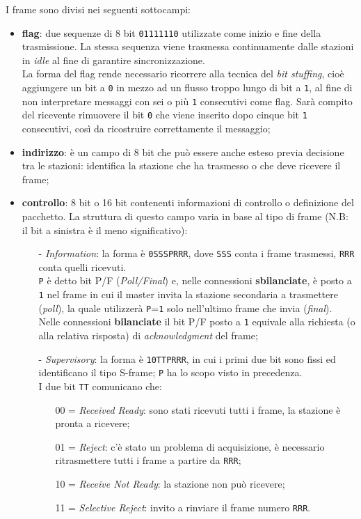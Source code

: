 \documentclass[a4paper,11pt]{article}
\def\code#1{\texttt{#1}}
\def\italic#1{\textit{#1}}
\begin{document}
I frame sono divisi nei seguenti sottocampi:
\begin{itemize}
	\item \textbf{flag}: due sequenze di 8 bit \code{01111110} utilizzate come inizio e fine della trasmissione. La stessa sequenza viene trasmessa continuamente dalle stazioni in \italic{idle} al fine di garantire sincronizzazione.
	\\La forma del flag rende necessario ricorrere alla tecnica del \italic{bit stuffing}, cioè aggiungere un bit a \code{0} in mezzo ad un flusso troppo lungo di bit a \code{1}, al fine di non interpretare messaggi con sei o più \code{1} consecutivi come flag.
	Sarà compito del ricevente rimuovere il bit \code{0} che viene inserito dopo cinque bit \code{1} consecutivi, così da ricostruire correttamente il messaggio;
	\item \textbf{indirizzo}: è un campo di 8 bit che può essere anche esteso previa decisione tra le stazioni: identifica la stazione che ha trasmesso o che deve ricevere il frame;
	\item \textbf{controllo}: 8 bit o 16 bit contenenti informazioni di controllo o definizione del pacchetto. La struttura di questo campo varia in base al tipo di frame (N.B: il bit a sinistra è il meno significativo):
	\begin{itemize}
		\item[-]\italic{Information}: la forma è \code{0SSSPRRR}, dove \code{SSS} conta i frame trasmessi, \code{RRR} conta quelli ricevuti.
		\\\code{P} è detto bit P/F (\italic{Poll/Final}) e, nelle connessioni \textbf{sbilanciate}, è posto a \code{1} nel frame in cui il master invita la stazione secondaria a trasmettere (\italic{poll}), la quale utilizzerà \code{P}=\code{1} solo nell'ultimo frame che invia (\italic{final}).
		Nelle connessioni \textbf{bilanciate} il bit P/F posto a \code{1} equivale alla richiesta (o alla relativa risposta) di \textit{acknowledgment} del frame;
		
		\item[-]\italic{Supervisory}: la forma è \code{10TTPRRR}, in cui i primi due bit sono fissi ed identificano il tipo S-frame; \code{P} ha lo scopo visto in precedenza.
		\\I due bit \code{TT} comunicano che:
		\begin{itemize}
			\item[00]= \italic{Received Ready}: sono stati ricevuti tutti i frame, la stazione è pronta a ricevere;
			\item[01]= \italic{Reject}: c'è stato un problema di acquisizione, è necessario ritrasmettere tutti i frame a partire da \code{RRR};
			\item[10]= \italic{Receive Not Ready}: la stazione non può ricevere;
			\item[11]= \italic{Selective Reject}: invito a rinviare il frame numero \code{RRR}.
		\end{itemize}
		

\end{itemize}
\end{itemize}
\end{document}
